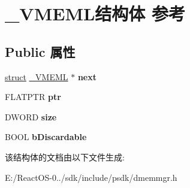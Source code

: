 \hypertarget{struct___v_m_e_m_l}{}\section{\+\_\+\+V\+M\+E\+M\+L结构体 参考}
\label{struct___v_m_e_m_l}
\subsection*{Public 属性}
\begin{DoxyCompactItemize}
\item 
\mbox{\label{struct___v_m_e_m_l_a586f753f23e3c3c61bda19c1c790c314}} 
\hyperlink{interfacestruct}{struct} \hyperlink{struct___v_m_e_m_l}{\+\_\+\+V\+M\+E\+ML} $\ast$ {\bfseries next}
\item 
\mbox{\label{struct___v_m_e_m_l_a09cb882775bc300353bb3dd710d65810}} 
F\+L\+A\+T\+P\+TR {\bfseries ptr}
\item 
\mbox{\label{struct___v_m_e_m_l_a75a31f798a37916f28800e8de6553015}} 
D\+W\+O\+RD {\bfseries size}
\item 
\mbox{\label{struct___v_m_e_m_l_a1f26dc688e6f1f090dcd7a3b29576df0}} 
B\+O\+OL {\bfseries b\+Discardable}
\end{DoxyCompactItemize}


该结构体的文档由以下文件生成\+:\begin{DoxyCompactItemize}
\item 
E\+:/\+React\+O\+S-\/0../sdk/include/psdk/dmemmgr.\+h\end{DoxyCompactItemize}
